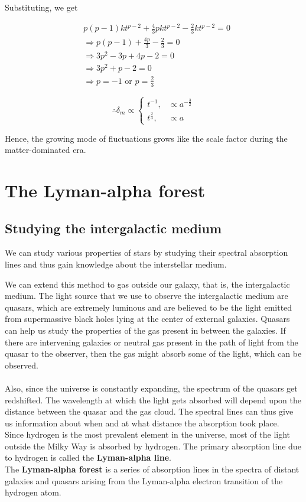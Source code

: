 \documentclass[a4,12pt,oneside]{report}
\begin{document}
	Substituting, we get
	
	\begin{align}\label{key}
	&p(p-1)kt^{p-2} + \frac{4}{3}pkt^{p-2} - \frac{2}{3}kt^{p-2} = 0 \nonumber
	\\
	&\Rightarrow p(p-1)+\frac{4p}{3} - \frac{2}{3} = 0 \nonumber
	\\
	&\Rightarrow 3p^2 - 3p + 4p -2 =0 \nonumber
	\\
	&\Rightarrow 3p^2+p-2 = 0 \nonumber
	\\
	&\Rightarrow p=-1 \text{ or } p=\frac{2}{3} \nonumber
	\end{align}
	
	\begin{equation}\label{key}
	\therefore \delta_m \propto \begin{cases}t^{-1}, &\propto a^{-\frac{3}{2}}\\
	t^{\frac{2}{3}}, &\propto a
	\end{cases}
	\end{equation}
	
	Hence, the growing mode of fluctuations grows like the scale factor during the matter-dominated era.
	
	
	
	\chapter{The Lyman-alpha forest}
	
	\section{Studying the intergalactic medium}
	We can study various properties of stars by studying their spectral absorption lines and thus gain knowledge about the interstellar medium.
	
	We can extend this method to gas outside our galaxy, that is, the intergalactic medium. The light source that we use to 
	observe the intergalactic medium are quasars, which are extremely luminous and are believed to be the light emitted from 
	supermassive black holes lying at the center of external galaxies. 
	Quasars can help us study the properties of the gas present in between the galaxies.
	If there are intervening galaxies or neutral gas present in the path of light from the quasar to the observer, then the gas might absorb some of the light,
	which can be observed.
	\\ \\
	Also, since the universe is constantly expanding, the spectrum of the quasars get redshifted. The wavelength at which the light gets absorbed will depend upon the 
	distance between the quasar and the gas cloud. The spectral lines can thus give us information about when and at what distance the absorption took place. 
	\\
	Since hydrogen is the most prevalent element in the universe, most of the light outside the Milky Way is absorbed by hydrogen.
	The primary absorption line due to hydrogen is called the {\bf Lyman-alpha line}.
	\\
	The {\bf Lyman-alpha forest} is a series of absorption lines in the spectra of distant galaxies and quasars arising from the Lyman-alpha electron transition of the hydrogen atom.
\end{document}

